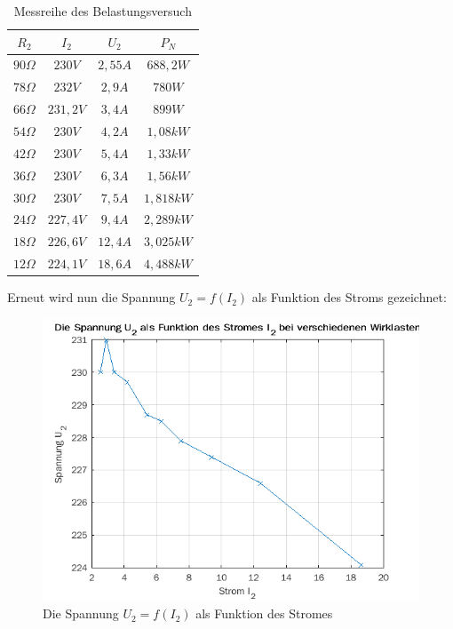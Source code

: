 \documentclass{article}
\begin{document}
\begin{table}[h]
  \centering
  \begin{tabular}{|c|c|c|c|}
    \hline
    $R_{2}$ & $I_{2}$ & $U_{2}$ & $P_{N}$ \\
    \hline
    $90\Omega$ & $230V$ & $2,55A$ & $688,2W$\\
    \hline
    $78\Omega$ & $232V$ & $2,9A$ & $780W$\\
    \hline
    $66\Omega$ & $231,2V$ & $3,4A$ & $899W$\\
    \hline
    $54\Omega$ & $230V$ & $4,2A$ & $1,08kW$\\
    \hline
    $42\Omega$ & $230V$ & $5,4A$ & $1,33kW$\\
    \hline
    $36\Omega$ & $230V$ & $6,3A$ & $1,56kW$ \\
    \hline
    $30\Omega$ & $230V$ & $7,5A$ & $1,818kW$ \\
    \hline
    $24\Omega$ & $227,4V$ & $9,4A$ & $2,289kW$ \\
    \hline
    $18\Omega$ & $226,6V$ & $12,4A$ & $3,025kW$ \\
    \hline
    $12\Omega$ & $224,1V$ & $18,6A$ & $4,488kW$\\
    \hline
  \end{tabular}
  \caption{Messreihe des Belastungsversuch}
  \label{tab:messbelast}
\end{table}
\newpage
Erneut wird nun die Spannung $U_{2} = f(I_{2})$ als Funktion des Stroms gezeichnet:

\begin{figure}[h]
  \centering
  \includegraphics[width=\textwidth]{../assets/images/gep3/i2_u2.png}
  \caption{Die Spannung $U_2 = f(I_2)$ als Funktion des Stromes}
  \label{fig:u2i2}
\end{figure}
\end{document}
